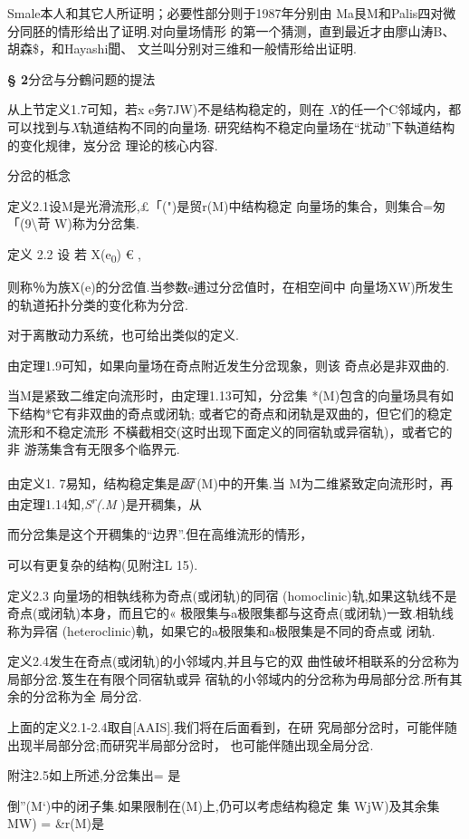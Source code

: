 \documentclass{article}
\begin{document}
Smale本人和其它人所证明；必要性部分则于1987年分别由
Ma艮M和Palis四对微分同胚的情形给出了证明.对向量场情形
的第一个猜测，直到最近才由廖山涛B、胡森\$，和Hayashi聞、
文兰叫分别对三维和一般情形给出证明.

\textbf{§ 2}分岔与分鶴问题的提法

从上节定义1.7可知，若x e务7JW)不是结构稳定的，则在
\emph{X}的任一个C邻域内，都可以找到与\emph{X}轨道结构不同的向量场.
研究结构不稳定向量场在``扰动''下執道结构的变化规律，岌分岔
理论的核心内容.

分岔的柢念

定义2.1设M是光滑流形,£「(")是贸r(M)中结构稳定
向量场的集合，则集合=匆「(9\textbackslash{}苛 W)称为分岔集.

定义 2.2 设 若 X(e\textsubscript{0}) € ,

则称％为族X(e)的分岔值.当参数e逋过分岔值时，在相空间中
向量场XW)所发生的轨道拓扑分类的变化称为分岔.

对于离散动力系统，也可给出类似的定义.

由定理1.9可知，如果向量场在奇点附近发生分岔现象，则该 奇点必是非双曲的.

当M是紧致二维定向流形时，由定理1.13可知，分岔集
*(M)包含的向量场具有如下结构*它有非双曲的奇点或闭轨;
或者它的奇点和闭轨是双曲的，但它们的稳定流形和不稳定流形
不橫截相交(这时出现下面定义的同宿轨或异宿轨)，或者它的非
游荡集含有无限多个临界元.

由定义1. 7易知，结构稳定集是\emph{函}\textsuperscript{r}(M)中的开集.当
M为二维紧致定向流形时，再由定理1.14知\emph{,S\textsuperscript{r}(.M}
)是开稠集，从

而分岔集是这个开稠集的``边界''.但在高维流形的情形，

可以有更复杂的结构(见附注L 15).

定义2.3 向量场的相執线称为奇点(或闭轨)的同宿
(homoclinic)轨,如果这轨线不是奇点(或闭轨)本身，而且它的«
极限集与a极限集都与这奇点(或闭轨)一致.相轨线称为异宿
(heteroclinic)軌，如果它的a极限集和a极限集是不同的奇点或 闭轨.

定义2.4发生在奇点(或闭轨)的小邻域内,并且与它的双
曲性破坏相联系的分岔称为局部分岔.笈生在有限个同宿轨或异
宿轨的小邻域内的分岔称为毋局部分岔.所有其余的分岔称为全 局分岔.

上面的定义2.1-2.4取自{[}AAIS{]}.我们将在后面看到，在研
究局部分岔时，可能伴随出现半局部分岔;而研究半局部分岔时，
也可能伴随出现全局分岔.

附注2.5如上所述,分岔集出= 是

倒''(M`)中的闭子集.如果限制在(M)上,仍可以考虑结构稳定 集 WjW)及其余集
MW) = \&r(M)是
\end{document}
